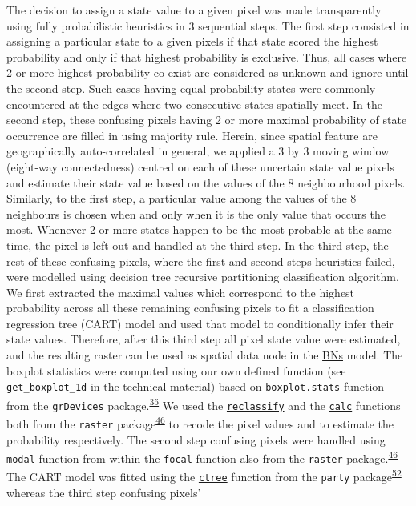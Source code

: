 \documentclass[12pt,oneside]{article}
\begin{document}
The decision to assign a state value to a given pixel was made transparently using fully probabilistic heuristics in 3 sequential steps. The first step consisted in assigning a particular state to a given pixels if that state scored the highest probability and only if that highest probability is exclusive. Thus, all cases where 2 or more highest probability co-exist are considered as unknown and ignore until the second step. Such cases having equal probability states were commonly encountered at the edges where two consecutive states spatially meet. In the second step, these confusing pixels having 2 or more maximal probability of state occurrence are filled in using majority rule. Herein, since spatial feature are geographically auto-correlated in general, we applied a 3 by 3 moving window (eight-way connectedness) centred on each of these uncertain state value pixels and estimate their state value based on the values of the 8 neighbourhood pixels. Similarly, to the first step, a particular value among the values of the 8 neighbours is chosen when and only when it is the only value that occurs the most. Whenever 2 or more states happen to be the most probable at the same time, the pixel is left out and handled at the third step. In the third step, the rest of these confusing pixels, where the first and second steps heuristics failed, were modelled using decision tree recursive partitioning classification algorithm. We first extracted the maximal values which correspond to the highest probability across all these remaining confusing pixels to fit a classification regression tree (CART) model and used that model to conditionally infer their state values. Therefore, after this third step all pixel state value were estimated, and the resulting raster can be used as spatial data node in the \href{https://en.wikipedia.org/wiki/Bayesian_network}{BNs} model. The boxplot statistics were computed using our own defined function (see \texttt{get\_boxplot\_1d} in the technical material) based on \href{https://www.rdocumentation.org/packages/grDevices/versions/3.5.3/topics/boxplot.stats}{\texttt{boxplot.stats}} function from the \texttt{grDevices} package.\textsuperscript{\protect\hyperlink{ref-RCoreTeam_2018}{35}} We used the \href{https://www.rdocumentation.org/packages/raster/versions/2.8-19/topics/reclassify}{\texttt{reclassify}} and the \href{https://www.rdocumentation.org/packages/raster/versions/2.8-19/topics/calc}{\texttt{calc}} functions both from the \texttt{raster} package\textsuperscript{\protect\hyperlink{ref-Hijmans_2019}{46}} to recode the pixel values and to estimate the probability respectively. The second step confusing pixels were handled using \href{https://www.rdocumentation.org/packages/raster/versions/2.8-19/topics/modal}{\texttt{modal}} function from within the \href{https://www.rdocumentation.org/packages/raster/versions/2.8-19/topics/focal}{\texttt{focal}} function also from the \texttt{raster} package.\textsuperscript{\protect\hyperlink{ref-Hijmans_2019}{46}} The CART model was fitted using the \href{https://www.rdocumentation.org/packages/party/versions/1.3-3/topics/Conditional\%20Inference\%20Trees}{\texttt{ctree}} function from the \texttt{party} package\textsuperscript{\protect\hyperlink{ref-Hothorn_et_al_2006}{52}} whereas the third step confusing pixels' 
\end{document}
